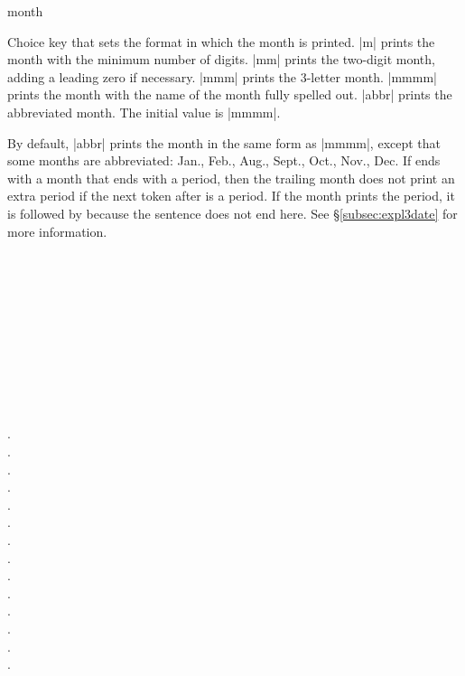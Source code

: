 \documentclass{beerydoc}
\begin{document}
\begin{codedoc}{month}
  \begin{syntax}
  \end{syntax}
  Choice key that sets the format in which the month is printed.
  |m| prints the month with the minimum number of digits.
  |mm| prints the two-digit month, adding a leading zero if necessary.
  |mmm| prints the 3-letter month.
  |mmmm| prints the month with the name of the month fully spelled out.
  |abbr| prints the abbreviated month.
  The initial value is |mmmm|.

  By default, |abbr| prints the month in the same form as |mmmm|, except that
  some months are abbreviated: Jan., Feb., Aug., Sept., Oct., Nov., Dec.
  If  ends with a month that ends with a period, then the
  trailing month does not print an extra period if the next token after
   is a period.
  If the month prints the period, it is followed by  because the sentence
  does not end here.
  See \S\ref{subsec:expl3date} for more information.
  \begin{codedemo}
    \\
    \\
    \\
    \\
    \\
    \\
    \\
    \\
    \\
  \end{codedemo}
\end{codedoc}
\begin{codedemo}
  .\\
  .\\
  .\\
  .\\
  .\\
  .\\
  .\\
  .\\
  .\\
  .\\
  .\\
  .\\
  .\\
  .
\end{codedemo}
\end{document}
